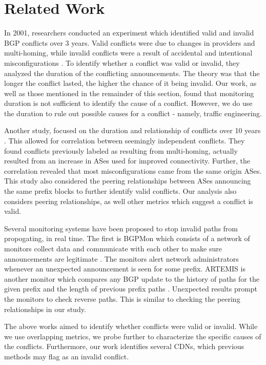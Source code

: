  \section{Related Work}\label{sec:relatedwork}

In 2001, researchers conducted an experiment which identified valid and invalid BGP conflicts over 3 years. Valid conflicts were due to changes in providers and multi-homing, while invalid conflicts were a result of accidental and intentional misconfigurations \cite{colorado}. To identify whether a conflict was valid or invalid, they analyzed the duration of the conflicting announcements. The theory was that the longer the conflict lasted, the higher the chance of it being invalid. Our work, as well as those mentioned in the remainder of this section, found that monitoring duration is not sufficient to identify the cause of a conflict. However, we do use the duration to rule out possible causes for a conflict - namely, traffic engineering.

Another study, focused on the duration and relationship of conflicts over 10 years \cite{euro}. This allowed for correlation between seemingly independent conflicts. They found conflicts previously labeled as resulting from multi-homing, actually resulted from an increase in ASes used for improved connectivity. Further, the correlation revealed that most misconfigurations came from the same origin ASes. This study also considered the peering relationships between ASes announcing the same prefix blocks to further identify valid conflicts. Our analysis also considers peering relationships, as well other metrics which suggest a conflict is valid.

Several monitoring systems have been proposed to stop invalid paths from propogating, in real time. The first is BGPMon which consists of a network of monitors collect data and communicate with each other to make sure announcements are legitimate \cite{bgpmon}. The monitors alert network administrators whenever an unexpected announcement is seen for some prefix. ARTEMIS is another monitor which compares any BGP update to the history of paths for the given prefix and the length of previous prefix paths \cite{artemis}. Unexpected results prompt the monitors to check reverse paths. This is similar to checking the peering relationships in our study. 

The above works aimed to identify whether conflicts were valid or invalid. While we use overlapping metrics, we probe further to characterize the specific causes of the conflicts. Furthermore, our work identifies several CDNs, which previous methods may flag as an invalid conflict.
